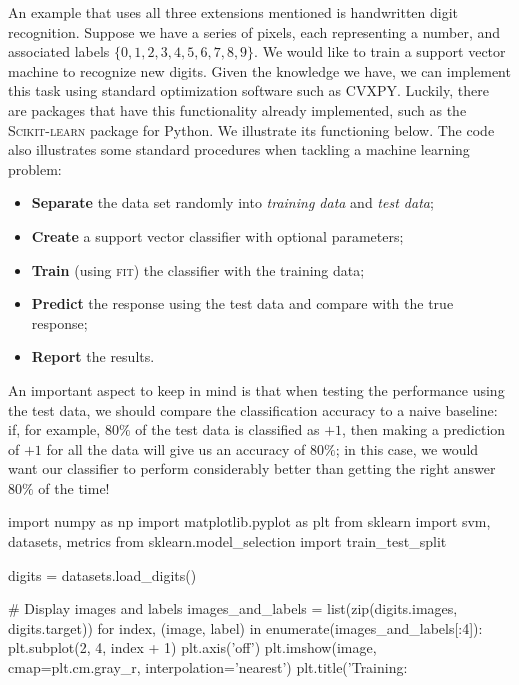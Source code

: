 \begin{example}
An example that uses all three extensions mentioned is handwritten digit recognition. Suppose we have a series of pixels, each representing a number, and associated labels $\{0,1,2,3,4,5,6,7,8,9\}$. We would like to train a support vector machine to recognize new digits. Given the knowledge we have, we can implement this task using standard optimization software such as CVXPY. Luckily, there are packages that have this functionality already implemented, such as the \textsc{Scikit-learn} package for Python. We illustrate its functioning below. The code also illustrates some standard procedures when tackling a machine learning problem:
\begin{itemize}
\item \textbf{Separate} the data set randomly into {\em training data} and {\em test data};
\item \textbf{Create} a support vector classifier with optional parameters;
\item \textbf{Train} (using \textsc{fit}) the classifier with the training data;
\item \textbf{Predict} the response using the test data and compare with the true response;
\item \textbf{Report} the results.
\end{itemize}
An important aspect to keep in mind is that when testing the performance using the test data, we should compare the classification accuracy to a naive baseline: if, for example, $80\%$ of the test data is classified as $+1$, then making a prediction of $+1$ for all the data will give us an accuracy of $80\%$; in this case, we would want our classifier to perform considerably better than getting the right answer $80\%$ of the time!

\begin{ipythonnb}
import numpy as np
import matplotlib.pyplot as plt
from sklearn import svm, datasets, metrics
from sklearn.model_selection import train_test_split
\end{ipythonnb}

\begin{ipythonnb}
digits = datasets.load_digits()

# Display images and labels
images_and_labels = list(zip(digits.images, digits.target))
for index, (image, label) in enumerate(images_and_labels[:4]):
    plt.subplot(2, 4, index + 1)
    plt.axis('off')
    plt.imshow(image, cmap=plt.cm.gray_r, interpolation='nearest')
    plt.title('Training: %


\end{ipythonnb}
\end{example}
